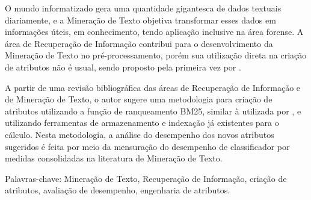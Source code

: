 O mundo informatizado gera uma quantidade gigantesca de dados textuais diariamente, e a Mineração de Texto objetiva transformar esses dados em informações úteis, em conhecimento, tendo aplicação inclusive na área forense.
A área de Recuperação de Informação contribui para o desenvolvimento da Mineração de Texto no pré-processamento, porém sua utilização direta na criação de atributos não é usual, sendo proposto pela primeira vez por .

A partir de uma revisão bibliográfica das áreas de Recuperação de Informação e de Mineração de Texto, o autor sugere uma metodologia para criação de atributos utilizando a função de ranqueamento BM25, similar à utilizada por , e utilizando ferramentas de armazenamento e indexação já existentes para o cálculo.
Nesta metodologia, a análise do desempenho dos novos atributos sugeridos é feita por meio da mensuração do desempenho de classificador por medidas consolidadas na literatura de Mineração de Texto.


Palavras-chave: Mineração de Texto, Recuperação de Informação, criação de atributos, avaliação de desempenho, engenharia de atributos.